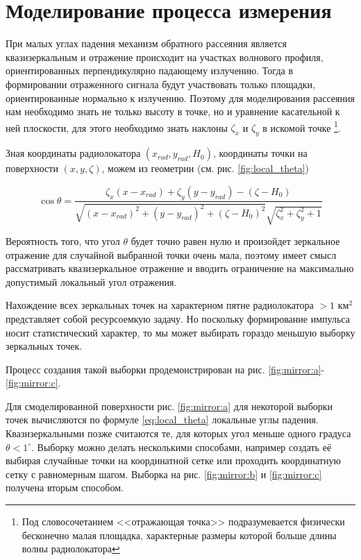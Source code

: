 
\section{Моделирование процесса измерения}



При малых углах падения механизм обратного  рассеяния является квазизеркальным
и отражение происходит на участках волнового профиля, ориентированных
перпендикулярно падающему излучению. Тогда в формировании отраженного сигнала
будут участвовать только площадки, ориентированные нормально к излучению. 
Поэтому для моделирования рассеяния нам необходимо знать не только высоту в
точке, но и уравнение касательной к ней плоскости, для этого необходимо знать
наклоны $\zeta_x$ и  $\zeta_y$ в искомой точке
\footnote{Под словосочетанием <<отражающая точка>> подразумевается физически
бесконечно малая площадка, характерные размеры  которой больше длины волны
радиолокатора}. 

Зная координаты радиолокатора  $(x_{rad},y_{rad},H_0)$, координаты точки на
поверхности $(x,y,\zeta)$, можем из геометрии (см. рис. \ref{fig:local_theta})

\begin{equation}
    \label{eq:local_theta}
    \cos \theta = \frac
    {\zeta_x (x - x_{rad}) + \zeta_y (y - y_{rad}) - (\zeta - H_0) }
        {
           \sqrt{(x - x_{rad})^2 + (y - y_{rad})^2 + (\zeta - H_0)^2 }
           \sqrt{\zeta_x^2 + \zeta_y^2 + 1}
        }
\end{equation}

Вероятность того, что угол $\theta$ будет точно равен нулю и произойдет
зеркальное отражение для случайной выбранной точки очень мала, поэтому имеет
смысл рассматривать квазизеркальное отражение и вводить ограничение на
максимально допустимый локальный угол отражения. 

Нахождение всех зеркальных точек на характерном пятне радиолокатора  $> 1
\text{ км}^2$ представляет собой ресурсоемкую задачу. Но поскольку формирование
импульса носит статистический характер, то мы может выбирать гораздо меньшую
выборку зеркальных точек. 

Процесс создания такой выборки продемонстрирован на рис. \ref{fig:mirror:a}-\ref{fig:mirror:c}. 

Для смоделированной поверхности  рис. \ref{fig:mirror:a} для некоторой
выборки точек вычисляются по формуле \eqref{eq:local_theta} локальные углы
падения. Квазизеркальными позже считаются те, для которых угол меньше одного
градуса $\theta < 1^\circ$. Выборку можно делать несколькими способами,
например создать её выбирая случайные точки на координатной сетке или проходить
координатную сетку с равномерным шагом. 
Выборка на рис. \ref{fig:mirror:b} и \ref{fig:mirror:c} получена вторым
способом. 

